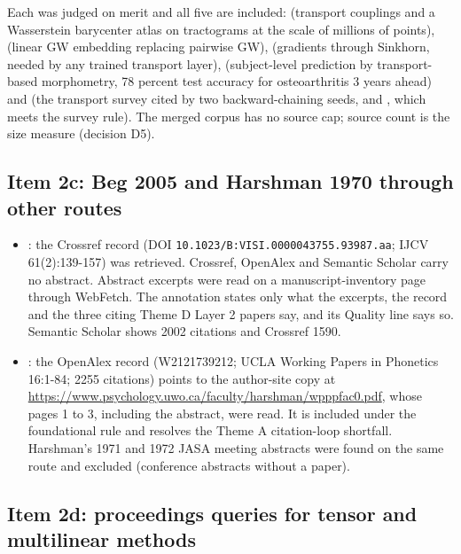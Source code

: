 \documentclass[journal,onecolumn]{IEEEtran}
\begin{document}
Each was judged on merit and all five are included: \cite{Feydy2019Fast} (transport couplings and a Wasserstein barycenter atlas on tractograms at the scale of millions of points), \cite{Beier2022Linear} (linear GW embedding replacing pairwise GW), \cite{Luise2018Differential} (gradients through Sinkhorn, needed by any trained transport layer), \cite{Kundu2020Enabling} (subject-level prediction by transport-based morphometry, 78 percent test accuracy for osteoarthritis 3 years ahead) and \cite{Peyre2019Computational} (the transport survey cited by two backward-chaining seeds, \cite{Mialon2021Trainable} and \cite{VincentCuaz2022Template}, which meets the survey rule). The merged corpus has no source cap; source count is the size measure (decision D5).

\subsection{Item 2c: Beg 2005 and Harshman 1970 through other routes}

\begin{itemize}

\item{} \cite{Beg2005Computing}: the Crossref record (DOI \nolinkurl{10.1023/B:VISI.0000043755.93987.aa}; IJCV 61(2):139-157) was retrieved. Crossref, OpenAlex and Semantic Scholar carry no abstract. Abstract excerpts were read on a manuscript-inventory page through WebFetch. The annotation states only what the excerpts, the record and the three citing Theme D Layer 2 papers say, and its Quality line says so. Semantic Scholar shows 2002 citations and Crossref 1590.

\item{} \cite{Harshman1970Foundations}: the OpenAlex record (W2121739212; UCLA Working Papers in Phonetics 16:1-84; 2255 citations) points to the author-site copy at \url{https://www.psychology.uwo.ca/faculty/harshman/wpppfac0.pdf}, whose pages 1 to 3, including the abstract, were read. It is included under the foundational rule and resolves the Theme A citation-loop shortfall. Harshman's 1971 and 1972 JASA meeting abstracts were found on the same route and excluded (conference abstracts without a paper).

\end{itemize}

\subsection{Item 2d: proceedings queries for tensor and multilinear methods}
\end{document}
